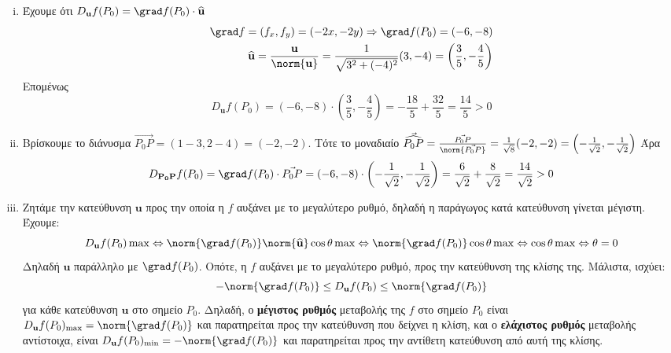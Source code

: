 \documentclass[a4paper,table]{report}
\begin{document}
\begin{solution}
  \begin{enumerate}[i)]
    \item Έχουμε ότι $ D_{\mathbf{u}}f(P_{0}) = \grad f(P_{0}) \cdot 
      \mathbf{\widehat{u}} $
      \begin{align*}
        \grad f = (f_{x}, f_{y}) = (-2x, -2y) \Rightarrow \grad f(P_{0}) = (-6,-8) \\
        \mathbf{\widehat{u}} = \frac{\mathbf{u}}{\norm{\mathbf{u}}} =
        \frac{1}{\sqrt{3^{2}+(-4)^{2}}} (3,-4) = \left(\frac{3}{5} , - 
        \frac{4}{5}\right)
      \end{align*} 
      Επομένως
      \[
        D_{\mathbf{u}}f(P_{0}) = (-6,-8) \cdot \left(\frac{3}{5} , - \frac{4}{5}\right) 
        = - \frac{18}{5} + \frac{32}{5} = \frac{14}{5} > 0
      \] 
    \item Βρίσκουμε το διάνυσμα $ \vec{P_{0}P} = (1-3,2-4) = (-2,-2) $. Τότε το 
      μοναδιαίο $ \vec{\widehat{P_{0}P}} =
      \frac{\vec{P_{0}P}}{\norm{\vec{P_{0}P}}} = \frac{1}{\sqrt{8}} (-2,-2) = \left(-
      \frac{1}{\sqrt{2}} , - \frac{1}{\sqrt{2}}\right) $
      Άρα 
      \[
        D_{\mathbf{P_{0}P}}f(P_{0}) = \grad f(P_{0}) \cdot \vec{P_{0}P} = (-6,-8) 
        \cdot \left(- \frac{1}{\sqrt{2}} , - \frac{1}{\sqrt{2}}\right) = 
        \frac{6}{\sqrt{2}} + \frac{8}{\sqrt{2}} = \frac{14}{\sqrt{2}} > 0
      \] 
    \item Ζητάμε την κατεύθυνση $ \mathbf{u} $ προς την οποία η $f$ αυξάνει με το 
      μεγαλύτερο ρυθμό, δηλαδή η παράγωγος κατά κατεύθυνση γίνεται μέγιστη. Έχουμε:
      \[
        D_{\mathbf{u}}f(P_{0}) \max \Leftrightarrow \norm{\grad f (P_{0})}
        \norm{\mathbf{\widehat{u}}} \cos{\theta} \max \Leftrightarrow 
        \norm{\grad f(P_{0})} \cos{\theta} \max \Leftrightarrow \cos{\theta} \max
        \Leftrightarrow \theta = 0
      \]
      Δηλαδή $ \mathbf{u} $ παράλληλο με $ \grad f(P_{0}) $. Οπότε, η $f$ αυξάνει με 
      το μεγαλύτερο ρυθμό, προς την κατεύθυνση της κλίσης της. Μάλιστα, ισχύει:
      \[
        - \norm{\grad f(P_{0})} \leq D_{\mathbf{u}} f(P_{0}) \leq \norm{\grad f(P_{0})}
      \]
      για κάθε κατεύθυνση $ \mathbf{u} $ στο σημείο $ P_{0} $. 
      Δηλαδή, ο \textbf{μέγιστος ρυθμός} μεταβολής της $f$ στο σημείο $ P_{0} $ είναι $
      D_{\mathbf{u}}f(P_{0})_{\max} = \norm{\grad f(P_{0})} $ και παρατηρείται προς 
      την κατεύθυνση που δείχνει η κλίση, και ο \textbf{ελάχιστος ρυθμός} μεταβολής
      αντίστοιχα, είναι $ D_{\mathbf{u}}f(P_{0})_{\min} = -\norm{\grad f(P_{0})} $ 
      και παρατηρείται προς την αντίθετη κατεύθυνση από αυτή της κλίσης.

\end{enumerate}
\end{solution}
\end{document}
